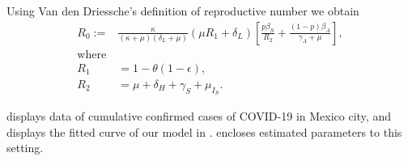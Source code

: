 Using Van den Driessche's \cite{Van2002} definition of reproductive number
we obtain
\begin{equation*}
    \label{eqn:reproductive_number}
    \begin{aligned}
        R_0 :=
        &
        \frac{\kappa}{(\kappa + \mu)(\delta_L + \mu)}
        \left(
            \mu R_1 + \delta_L
        \right)
        \left[
            \frac{p\beta_S}{R_2}
            +\frac{(1 - p) \beta_A}{\gamma_A+\mu}
        \right],
    \\
    \text{where} &
    \\
        R_1 &= 1 - \theta(1 - \epsilon),
    \\
        R_2 &= \mu + \delta_H + \gamma_S + \mu_{I_{S}}.
    \end{aligned}
\end{equation*}



 displays data of cumulative confirmed cases
of COVID-19 in Mexico city, and  displays the fitted curve
of our model in .
 encloses estimated parameters to this
setting.

